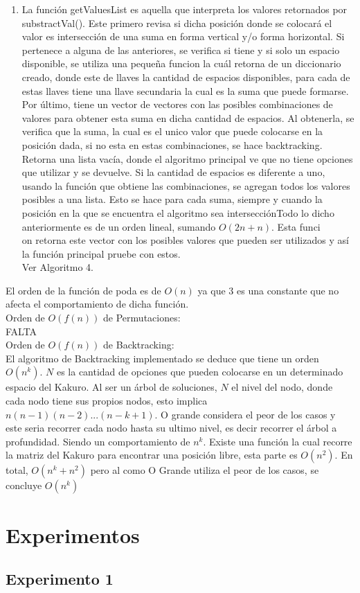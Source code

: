 \documentclass[conference]{IEEEtran}
\begin{document}
\begin{enumerate}[I]
\item La funci\'on getValuesList es aquella que interpreta los valores retornados por substractVal(). Este primero revisa si dicha posici\'on donde se colocar\'a el valor es intersecci\'on de una suma en forma vertical y/o forma horizontal. Si pertenece a alguna de las anteriores, se verifica si tiene y si solo un espacio disponible, se utiliza una pequeña funcion la cu\'al retorna de un diccionario creado, donde este de llaves la cantidad de espacios disponibles, para cada de estas llaves tiene una llave secundaria la cual es la suma que puede formarse. Por \'ultimo, tiene un vector de vectores con las posibles combinaciones de valores para obtener esta suma en dicha cantidad de espacios.  Al obtenerla, se verifica que la suma, la cual es el unico valor que puede colocarse en la posici\'on dada, si no esta en estas combinaciones, se hace backtracking. Retorna una lista vac\'ia, donde el algoritmo principal ve que no tiene opciones que utilizar y se devuelve. Si la cantidad de espacios es diferente a uno, usando la funci\'on que obtiene las combinaciones, se agregan todos los valores posibles a una lista. Esto se hace para cada suma, siempre y cuando la posici\'on en la que se encuentra el algoritmo sea intersecci\'onTodo lo dicho anteriormente es de un orden lineal, sumando $O(2n + n)$. Esta funci\\on retorna este vector con los posibles valores que pueden ser utilizados y as\'i la funci\'on principal pruebe con estos.\\
Ver Algoritmo 4.
\end{enumerate}
El orden de la funci\'on de poda es de $O(n)$ ya que $3$ es una constante que no afecta el comportamiento de dicha funci\'on.
\\
Orden de $O(f(n))$ de Permutaciones:\\
FALTA
\\
Orden de $O(f(n))$ de Backtracking:\\
El algoritmo de Backtracking implementado se deduce que tiene un orden $O(n^k)$. $N$ es la cantidad de opciones que pueden colocarse en un determinado espacio del Kakuro. Al ser un \'arbol de soluciones, $N$ el nivel del nodo,  donde cada nodo tiene sus propios nodos, esto implica $n(n-1)(n-2)...(n-k+1)$. O grande considera el peor de los casos y este seria recorrer cada nodo hasta su ultimo nivel, es decir recorrer el \'arbol a profundidad. Siendo un comportamiento de $n^k$. Existe una funci\'on la cual recorre la matriz del Kakuro para encontrar una posici\'on libre, esta parte es $O(n^2)$. En total, $O(n^k + n^2)$ pero al como O Grande utiliza el peor de los casos, se concluye $O(n^k)$


\section{Experimentos}
\subsection{Experimento 1}


\end{document}

